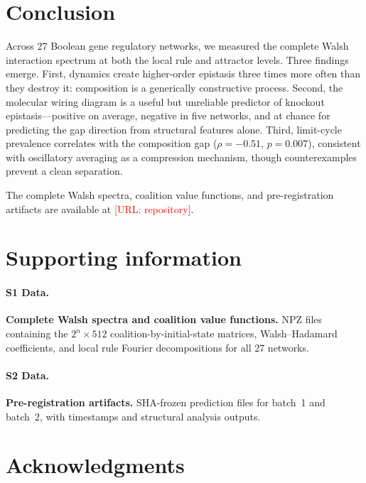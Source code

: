 \documentclass[10pt,letterpaper]{article}
\begin{document}
\section*{Conclusion}
\label{sec:conclusion}

Across 27 Boolean gene regulatory networks, we measured the complete
Walsh interaction spectrum at both the local rule and attractor
levels. Three findings emerge. First, dynamics create higher-order
epistasis three times more often than they destroy it: composition
is a generically constructive process. Second, the molecular wiring
diagram is a useful but unreliable predictor of knockout
epistasis---positive on average, negative in five networks, and at
chance for predicting the gap direction from structural features
alone. Third, limit-cycle prevalence correlates with the composition
gap ($\rho = -0.51$, $p = 0.007$), consistent with oscillatory
averaging as a compression mechanism, though counterexamples prevent
a clean separation.

The complete Walsh spectra, coalition value functions, and
pre-registration artifacts are available at
\textcolor{red}{[URL: repository]}.


\section*{Supporting information}

\paragraph*{S1 Data.}
\label{S1_Data}
{\bf Complete Walsh spectra and coalition value functions.}
NPZ files containing the $2^n \times 512$ coalition-by-initial-state
matrices, Walsh--Hadamard coefficients, and local rule Fourier
decompositions for all 27 networks.

\paragraph*{S2 Data.}
\label{S2_Data}
{\bf Pre-registration artifacts.}
SHA-frozen prediction files for batch~1 and batch~2, with timestamps
and structural analysis outputs.


\section*{Acknowledgments}


\nolinenumbers


\end{document}
